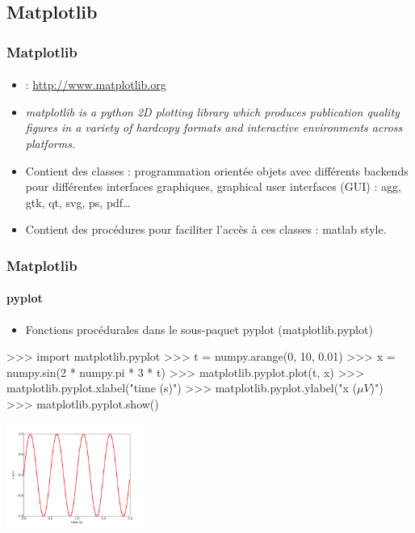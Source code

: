 \subsection{Matplotlib}
\begin{frame}[fragile]
\frametitle{Matplotlib}
\framesubtitle{}
\begin{itemize}
 \item {} : \url{http://www.matplotlib.org}
 \item \emph{matplotlib is a python 2D plotting library which produces publication quality figures in a variety of hardcopy formats and interactive environments across platforms. }
 \item Contient des classes : programmation orientée objets avec différents backends pour différentes interfaces graphiques, graphical user interfaces (GUI) : agg, gtk, qt, svg, ps, pdf\dots
 \item Contient des procédures pour faciliter l'accès à ces classes : matlab style. 
\end{itemize}
\end{frame}
\begin{frame}[fragile]
\frametitle{Matplotlib}
\framesubtitle{pyplot}
\begin{itemize}
 \item Fonctions procédurales dans le sous-paquet pyplot (matplotlib.pyplot)
\end{itemize}
\begin{pythonConsole}
>>> import matplotlib.pyplot
>>> t = numpy.arange(0, 10, 0.01)
>>> x = numpy.sin(2 * numpy.pi * 3 * t)
>>> matplotlib.pyplot.plot(t, x)
>>> matplotlib.pyplot.xlabel("time (s)")
>>> matplotlib.pyplot.ylabel("x ($\mu V$)")
>>> matplotlib.pyplot.show()
\end{pythonConsole}
\begin{center}
 \includegraphics[width=4.5cm]{./fig/matplotlibSinus.pdf}
\end{center}
\end{frame}
